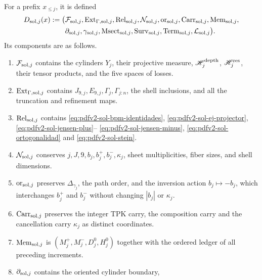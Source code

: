 For a prefix \(x_{\leq j}\), it is defined
\begin{equation}\label{eq:pdfv2-sol-d-package}
 \begin{aligned}
 D_{{\rm sol},j}(x):=\bigl(&
 \mathcal F_{{\rm sol},j},
 \operatorname{Ext}_{\Gamma,{\rm sol},j},
 \operatorname{Rel}_{{\rm sol},j},
 \mathcal N_{{\rm sol},j},
 \operatorname{or}_{{\rm sol},j},
 \operatorname{Carr}_{{\rm sol},j},
 \operatorname{Mem}_{{\rm sol},j},\\
 &\partial_{{\rm sol},j},
 \gamma_{{\rm sol},j},
 \operatorname{Msect}_{{\rm sol},j},
 \operatorname{Surv}_{{\rm sol},j},
 \operatorname{Term}_{{\rm sol},j},
 \mathcal L_{{\rm sol},j}\bigr).
 \end{aligned}
\end{equation}
Its components are as follows.
\begin{enumerate}
 \item \(\mathcal F_{{\rm sol},j}\) contains the cylinders \(Y_j\), their projective
       measure, \(\mathscr H_j^{\rm depth}\),
       \(\mathscr H_j^{\rm res}\), their tensor products, and the five
       spaces of losses.
 \item \(\operatorname{Ext}_{\Gamma,{\rm sol},j}\) contains
       \(J_{9,j},E_{9,j},\Gamma_j,\Gamma_{j:n}\), the shell inclusions, and
       all the truncation and refinement maps.
 \item \(\operatorname{Rel}_{{\rm sol},j}\) contains
       \eqref{eq:pdfv2-sol-bpm-identidades},
       \eqref{eq:pdfv2-sol-ej-projector},
       \eqref{eq:pdfv2-sol-jensen-plus}--
       \eqref{eq:pdfv2-sol-jensen-minus},
       \eqref{eq:pdfv2-sol-ortogonalidad} and
       \eqref{eq:pdfv2-sol-stein}.
 \item \(\mathcal N_{{\rm sol},j}\) conserves
       \(j,J,9,b_j,b_j^+,b_j^-,\kappa_j\), sheet multiplicities, fiber sizes,
       and shell dimensions.
 \item \(\operatorname{or}_{{\rm sol},j}\) preserves
       \(\Delta_{\gamma_j}\), the path order, and the inversion action
       \(b_j\mapsto-b_j\), which interchanges \(b_j^+\) and \(b_j^-\) without changing
       \(|b_j|\) or \(\kappa_j\).
 \item \(\operatorname{Carr}_{{\rm sol},j}\) preserves the integer TPK carry, the composition carry and the cancellation carry \(\kappa_j\) as distinct coordinates.
 \item \(\operatorname{Mem}_{{\rm sol},j}\) is
       \((M_j^+,M_j^-,D_j^0,H_j^0)\) together with the ordered ledger of all
       preceding increments.
 \item \(\partial_{{\rm sol},j}\) contains the oriented cylinder boundary,

\end{enumerate}
